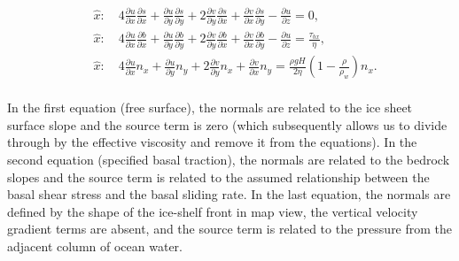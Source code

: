 \begin{equation}
\begin{split}
  & \hat{x}:\quad 4\frac{\partial u}{\partial x}\frac{\partial s}{\partial x}+ \frac{\partial u}{\partial y}\frac{\partial s}{\partial y}+2 \frac{\partial v}{\partial y}\frac{\partial s}{\partial x}+\frac{\partial v}{\partial x}\frac{\partial s}{\partial y}-\frac{\partial u}{\partial z}=0, \\ 
  & \hat{x}:\quad 4\frac{\partial u}{\partial x}\frac{\partial b}{\partial x}+\frac{\partial u}{\partial y}\frac{\partial b}{\partial y}+2\frac{\partial v}{\partial y}\frac{\partial b}{\partial x}+\frac{\partial v}{\partial x}\frac{\partial b}{\partial y}-\frac{\partial u}{\partial z}=\frac{\tau _{bx}}{\eta }, \\ 
  & \hat{x}:\quad 4\frac{\partial u}{\partial x}n_{x}+\frac{\partial u}{\partial y}n_{y}+2\frac{\partial v}{\partial y}n_{x}+\frac{\partial v}{\partial x}n_{y}=\frac{\rho gH}{2\eta }\left( 1-\frac{\rho }{\rho _{w}} \right)n_{x}. \\
\end{split}
\end{equation}

In the first equation (free surface), the normals are related to the ice sheet surface slope and the source term is zero (which subsequently allows us to divide through by the effective viscosity and remove it from the equations). In the second equation (specified basal traction), the normals are related to the bedrock slopes and the source term is related to the assumed relationship between the basal shear stress and the basal sliding rate. In the last equation, the normals are defined by the shape of the ice-shelf front in map view, the vertical velocity gradient terms are absent, and the source term is related to the pressure from the adjacent column of ocean water.
